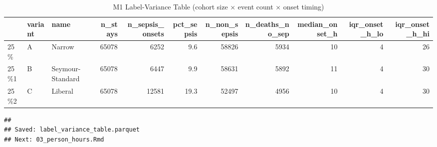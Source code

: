 \documentclass[
  11pt,
]{article}
\begin{document}
\begin{table}

\caption{\label{tab:label-variance-table}M1 Label-Variance Table (cohort size × event count × onset timing)}
\centering
\begin{tabular}[t]{l|l|l|r|r|r|r|r|r|r|r}
\hline
  & variant & name & n\_stays & n\_sepsis\_onsets & pct\_sepsis & n\_non\_sepsis & n\_deaths\_no\_sep & median\_onset\_h & iqr\_onset\_h\_lo & iqr\_onset\_h\_hi\\
\hline
25\% & A & Narrow & 65078 & 6252 & 9.6 & 58826 & 5934 & 10 & 4 & 26\\
\hline
25\%1 & B & Seymour-Standard & 65078 & 6447 & 9.9 & 58631 & 5892 & 11 & 4 & 30\\
\hline
25\%2 & C & Liberal & 65078 & 12581 & 19.3 & 52497 & 4956 & 10 & 4 & 30\\
\hline
\end{tabular}
\end{table}

\begin{verbatim}
## 
## Saved: label_variance_table.parquet
## Next: 03_person_hours.Rmd
\end{verbatim}
\end{document}
